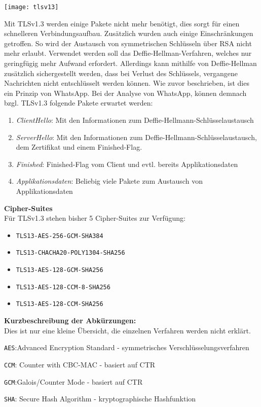 \begin{center}
    \texttt{[image: tlsv13]}
\end{center}
Mit TLSv1.3 werden einige Pakete nicht mehr benötigt, dies sorgt für einen 
schnelleren Verbindungsaufbau. Zusätzlich wurden auch einige Einschränkungen
getroffen. So wird der Austausch von symmetrischen Schlüsseln über RSA
nicht mehr erlaubt. Verwendet werden soll das Deffie-Hellman-Verfahren, welches
nur geringfügig mehr Aufwand erfordert. Allerdings kann mithilfe von Deffie-Hellman zusätzlich 
sichergestellt werden, dass bei Verlust des Schlüssels, vergangene Nachrichten
nicht entschlüsselt werden können. Wie zuvor beschrieben, ist dies 
ein Prinzip von WhatsApp.
Bei der Analyse von WhatsApp, können demnach bzgl. TLSv1.3 folgende Pakete erwartet werden: 
\begin{enumerate}
    \item \textit{ClientHello}: Mit den Informationen zum Deffie-Hellmann-Schlüsselaustausch
    \item \textit{ServerHello}: Mit den Informationen zum Deffie-Hellmann-Schlüsselaustausch, dem Zertifikat und einem Finished-Flag.
    \item \textit{Finished}: Finished-Flag vom Client und evtl. bereits Applikationsdaten
    \item \textit{Applikationsdaten}: Beliebig viele Pakete zum Austausch von Applikationsdaten
\end{enumerate}
\textbf{Cipher-Suites}\\
\cite{tls2} Für TLSv1.3 stehen bisher 5 Cipher-Suites zur Verfügung: 
\begin{itemize}
    \item \texttt{TLS13-AES-256-GCM-SHA384}
    \item \texttt{TLS13-CHACHA20-POLY1304-SHA256}
    \item \texttt{TLS13-AES-128-GCM-SHA256}
    \item \texttt{TLS13-AES-128-CCM-8-SHA256}
    \item \texttt{TLS13-AES-128-CCM-SHA256}
\end{itemize}
\textbf{Kurzbeschreibung der Abkürzungen:}\\
Dies ist nur eine kleine Übersicht, die einzelnen Verfahren werden nicht erklärt.
\begin{description}
    \item \texttt{AES}:Advanced Encryption Standard - symmetrisches Verschlüsselungsverfahren
    \item \texttt{CCM}: Counter with CBC-MAC - basiert auf CTR
    \item \texttt{GCM}:Galois/Counter Mode - basiert auf CTR
    \item \texttt{SHA}: Secure Hash Algorithm - kryptographische Hashfunktion
\end{description}







 
